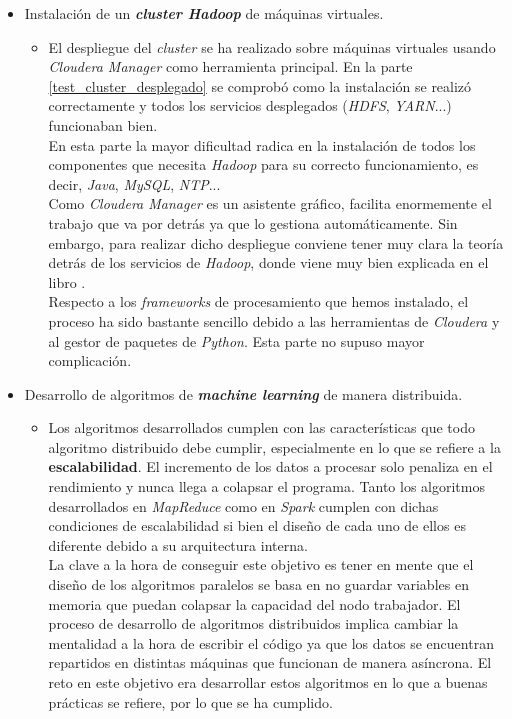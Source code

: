 \begin{itemize}
  \item Instalación de un \textbf{\textit{cluster Hadoop}} de máquinas virtuales.
  \begin{itemize}
    \item[] El despliegue del \textit{cluster} se ha realizado sobre máquinas virtuales usando \textit{Cloudera Manager}
            como herramienta principal. En la parte \autoref{test_cluster_desplegado} se comprobó como la instalación
            se realizó correctamente y todos los servicios desplegados (\textit{HDFS}, \textit{YARN}...) funcionaban bien.\\
            En esta parte la mayor dificultad radica en la instalación de todos los componentes que necesita 
            \textit{Hadoop} para su correcto funcionamiento, es decir, \textit{Java}, \textit{MySQL}, \textit{NTP}...\\
            Como \textit{Cloudera Manager} es un asistente gráfico, facilita enormemente el trabajo que va por detrás
            ya que lo gestiona automáticamente. Sin embargo, para realizar dicho despliegue conviene tener muy clara
            la teoría detrás de los servicios de \textit{Hadoop}, donde viene muy bien explicada en el libro 
            \cite{White:2009:HDG:1717298}.\\
            Respecto a los \textit{frameworks} de procesamiento que hemos instalado, el proceso ha sido bastante sencillo
            debido a las herramientas de \textit{Cloudera} y al gestor de paquetes de \textit{Python}. Esta parte no
            supuso mayor complicación.
  \end{itemize}
  \item Desarrollo de algoritmos de \textbf{\textit{machine learning}} de manera distribuida.
  \begin{itemize}
    \item[] Los algoritmos desarrollados cumplen con las características que todo algoritmo distribuido debe cumplir,
            especialmente en lo que se refiere a la \textbf{escalabilidad}. El incremento de los datos a procesar solo
            penaliza en el rendimiento y nunca llega a colapsar el programa. Tanto los algoritmos desarrollados en
            \textit{MapReduce} como en \textit{Spark} cumplen con dichas condiciones de escalabilidad si bien el diseño
            de cada uno de ellos es diferente debido a su arquitectura interna.\\
            La clave a la hora de conseguir este objetivo es tener en mente que el diseño de los algoritmos paralelos
            se basa en no guardar variables en memoria que puedan colapsar la capacidad del nodo trabajador.
            El proceso de desarrollo de algoritmos distribuidos implica cambiar la mentalidad a la hora de escribir
            el código ya que los datos se encuentran repartidos en distintas máquinas que funcionan de manera 
            asíncrona. El reto en este objetivo era desarrollar estos algoritmos en lo que a buenas prácticas se refiere,
            por lo que se ha cumplido.
  \end{itemize} 
\end{itemize}

